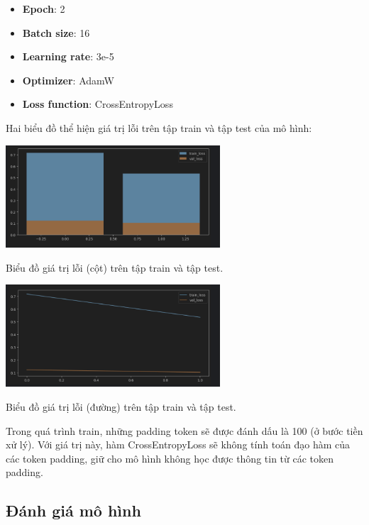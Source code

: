 \documentclass[a4paper, 10pt]{article}
\begin{document}
\begin{itemize}
    \item \textbf{Epoch}: 2
    \item \textbf{Batch size}: 16
    \item \textbf{Learning rate}: 3e-5
    \item \textbf{Optimizer}: AdamW
    \item \textbf{Loss function}: CrossEntropyLoss
\end{itemize}



Hai biểu đồ thể hiện giá trị lỗi trên tập train và tập test của mô hình:
\vspace{0.5cm}

\begin{minipage}{\linewidth}
    \captionsetup{type=figure}
    \centering
    \includegraphics[width=8cm]{./bar_plot.png}
    \caption{Biểu đồ giá trị lỗi (cột) trên tập train và tập test.}
\end{minipage}

\begin{minipage}{\linewidth}
    \captionsetup{type=figure}
    \centering
    \includegraphics[width=8cm]{./plot.png}
    \caption{Biểu đồ giá trị lỗi (đường) trên tập train và tập test.}
\end{minipage}

Trong quá trình train, những padding token sẽ được đánh dấu là 100 (ở bước tiền xử lý).
Với giá trị này, hàm CrossEntropyLoss sẽ không tính toán đạo hàm của các token padding, 
giữ cho mô hình không học được thông tin từ các token padding.

\subsection{Đánh giá mô hình}
\end{document}
